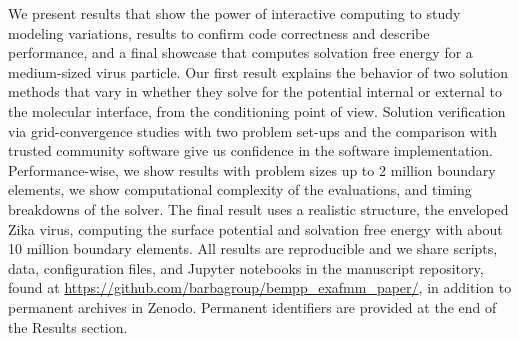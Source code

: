 We present results that show the power of interactive computing to study modeling variations, results to confirm code correctness and describe performance, and a final showcase that computes solvation free energy for a medium-sized virus particle.
Our first result explains the behavior of two solution methods that vary in whether they solve for the potential internal or external to the molecular interface, from the conditioning point of view.
Solution verification via grid-convergence studies with two problem set-ups and the comparison with trusted community software give us confidence in the software implementation.
Performance-wise, we show results with problem sizes up to 2 million boundary elements, we show computational complexity of the \fmm evaluations, and timing breakdowns of the solver.
The final result uses a realistic structure, the enveloped Zika virus, computing the surface potential and solvation free energy with about 10 million boundary elements.
All results are reproducible and we share scripts, data, configuration files, and Jupyter notebooks in the manuscript repository, found at \url{https://github.com/barbagroup/bempp_exafmm_paper/}, in addition to permanent archives in Zenodo.
Permanent identifiers are provided at the end of the Results section.
